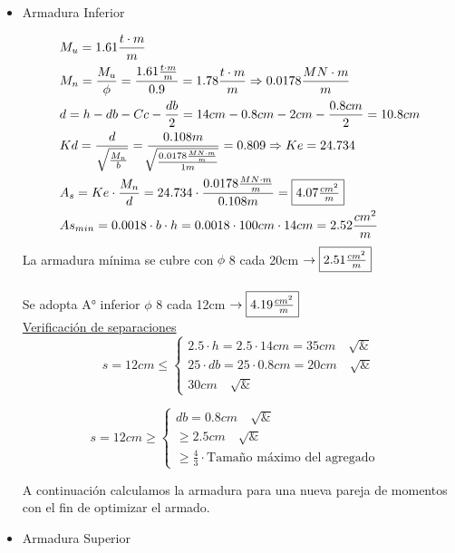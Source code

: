 \begin{enumerate}
\begin{itemize}
\item Armadura Inferior

\begin{align*}
& M_u = 1.61 \frac{t \cdot m}{m} \\
& M_n = \frac{M_u}{\phi} = \frac{1.61 \frac{t \cdot m}{m}}{0.9} = 1.78 \frac{t \cdot m}{m} \Rightarrow 0.0178 \frac{MN \cdot m}{m} \\
& d = h -db - Cc - \frac{db}{2} = 14cm - 0.8cm - 2cm - \frac{0.8cm}{2}= 10.8cm \\
& Kd = \frac{d}{\sqrt{\frac{M_n}{b}}} = \frac{0.108m}{\sqrt[]{\frac{0.0178 \frac{MN \cdot m}{m}}{1m}}} = 0.809 \Rightarrow Ke = 24.734 \\
& A_s = Ke \cdot \frac{M_n}{d} = 24.734 \cdot \frac{0.0178 \frac{MN \cdot m}{m}}{0.108m} = \framebox{$4.07 \frac{cm^2}{m}$}\\
& As_{min} = 0.0018 \cdot b \cdot h = 0.0018 \cdot 100cm \cdot 14cm = 2.52 \frac{cm^2}{m}
\end{align*}
La armadura mínima se cubre con $\phi$ 8 cada 20cm $\rightarrow \framebox{$2.51 \frac{cm^2}{m}$}$ \\
\\
Se adopta A° inferior $\phi$ 8 cada 12cm $\rightarrow \framebox{$4.19 \frac{cm^2}{m}$}$ \\

\underline{Verificación de separaciones}\\

\[ s = 12cm \leq \left\{ \begin{array}{ll}
         2.5 \cdot h = 2.5 \cdot 14cm = 35cm \quad \surd & \\
         25 \cdot db = 25 \cdot 0.8cm = 20cm \quad \surd &\\
         30cm \quad \surd & \end{array} \right. \] 
         
\[ s = 12cm \geq \left\{ \begin{array}{ll}
         db = 0.8cm \quad \surd & \\
         \geq 2.5cm \quad \surd &\\
         \geq \frac{4}{3} \cdot \text{Tamaño máximo del agregado} & \end{array} \right. \] 

A continuación calculamos la armadura para una nueva pareja de momentos con el fin de optimizar el armado.\\
\item Armadura Superior


\end{itemize}
\end{enumerate}
